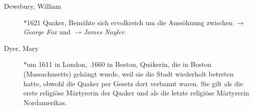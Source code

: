 \begin{description}
 \item[Dewsbury, William] $\ast$1621  Quaker, Bemühte sich ervolkreich um
 die Aussöhnung zwischen $\to$\textit{George Fox} und $\to$\textit{James Nayler}.

 \item[Dyer, Mary] $\ast$um 1611 in London, .1660 in Boston, Quäkerin, die in
 Boston (Massachusetts) gehängt wurde, weil sie die Stadt wiederholt betreten hatte,
 obwohl die Quaker per Gesetz dort verbannt waren. Sie gilt als die erste religiöse
 Märtyrerin der Quaker und als die letzte religiöse Märtyrerin Nordamerikas.

 \end{description}

\normalsize